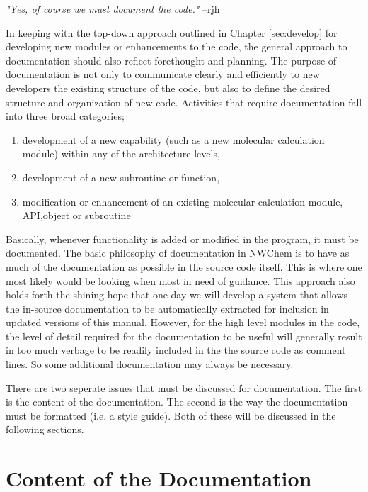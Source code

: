 \label{sec:newdoc}


{\em "Yes, of course we must document the code."}  --rjh

In keeping with the top-down approach outlined in Chapter \ref{sec:develop}
for developing new modules or enhancements to the code, the general
approach to documentation should also reflect forethought and planning.
The purpose of documentation is not only to communicate clearly and efficiently
to new developers the existing structure of the code, but also to define the desired
structure and organization of new code.  Activities that require documentation
fall into three broad categories;

\begin{enumerate}
\item development of a new capability (such as a new molecular calculation 
module) within any of the architecture levels,
\item development of a new subroutine or function,
\item modification or enhancement of an existing molecular calculation module,
API,object or subroutine
\end{enumerate}

Basically, whenever functionality is added or modified in the program, it
must be documented.  The basic philosophy of documentation in NWChem 
is to have as much of the documentation as possible in the source code itself.
This is where one most likely would be looking when most in
need of guidance.  This approach also holds forth the shining hope that
one day we will develop a system that allows the in-source documentation
to be automatically extracted for inclusion in updated versions of
this manual.  However, for the high level modules in the code, the level
of detail required for the documentation to be useful will generally
result in too much verbage to be readily included in the the source code as
comment lines.  So some
additional documentation may always be necessary.

There are two seperate issues that must be discussed for documentation.
The first is the content of the documentation.  The second is the
way the documentation must be formatted (i.e. a style guide).  Both of
these will be discussed in the following sections.

\section{Content of the Documentation}
\label{sec:standalone}

